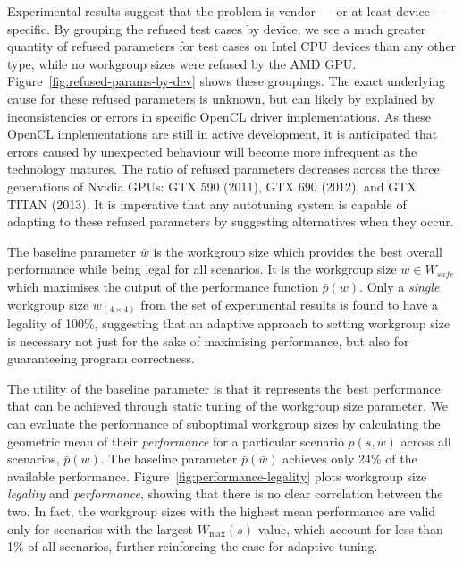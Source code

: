 \documentclass[nonatbib,preprint,10pt]{sigplanconf}
\begin{document}
Experimental results suggest that the problem is vendor --- or at
least device --- specific. By grouping the refused test cases by
device, we see a much greater quantity of refused parameters for test
cases on Intel CPU devices than any other type, while no workgroup
sizes were refused by the AMD
GPU. Figure~\ref{fig:refused-params-by-dev} shows these groupings. The
exact underlying cause for these refused parameters is unknown, but
can likely by explained by inconsistencies or errors in specific
OpenCL driver implementations. As these OpenCL implementations are
still in active development, it is anticipated that errors caused by
unexpected behaviour will become more infrequent as the technology
matures. The ratio of refused parameters decreases across the three
generations of Nvidia GPUs: GTX 590 (2011), GTX 690 (2012), and GTX
TITAN (2013). It is imperative that any autotuning system is capable
of adapting to these refused parameters by suggesting alternatives
when they occur.


The baseline parameter $\bar{w}$ is the workgroup size which provides
the best overall performance while being legal for all scenarios. It
is the workgroup size $w \in W_{safe}$ which maximises the output of
the performance function $\bar{p}(w)$.
Only a \emph{single} workgroup size $w_{(4 \times 4)}$ from the set of
experimental results is found to have a legality of 100\%, suggesting
that an adaptive approach to setting workgroup size is necessary not
just for the sake of maximising performance, but also for guaranteeing
program correctness.

The utility of the baseline parameter is that it represents the best
performance that can be achieved through static tuning of the
workgroup size parameter. We can evaluate the performance of
suboptimal workgroup sizes by calculating the geometric mean of their
\emph{performance} for a particular scenario $p(s, w)$ across all
scenarios, $\bar{p}(w)$. The baseline parameter $\bar{p}(\bar{w})$
achieves only 24\% of the available
performance. Figure~\ref{fig:performance-legality} plots workgroup
size \emph{legality} and \emph{performance}, showing that there is no
clear correlation between the two. In fact, the workgroup sizes with
the highest mean performance are valid only for scenarios with the
largest $W_{\max}(s)$ value, which account for less than 1\% of all
scenarios, further reinforcing the case for adaptive tuning.
\end{document}
